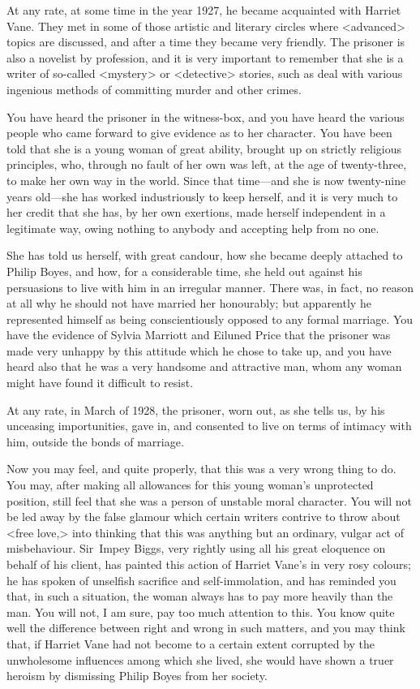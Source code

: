 At any rate, at some time in the year 1927, he became acquainted with Harriet Vane. They met in some of those artistic and literary circles where <advanced> topics are discussed, and after a time they became very friendly. The prisoner is also a novelist by profession, and it is very important to remember that she is a writer of so-called <mystery> or <detective> stories, such as deal with various ingenious methods of committing murder and other crimes.

You have heard the prisoner in the witness-box, and you have heard the various people who came forward to give evidence as to her character. You have been told that she is a young woman of great ability, brought up on strictly religious principles, who, through no fault of her own was left, at the age of twenty-three, to make her own way in the world. Since that time—and she is now twenty-nine years old—she has worked industriously to keep herself, and it is very much to her credit that she has, by her own exertions, made herself independent in a legitimate way, owing nothing to anybody and accepting help from no one.

She has told us herself, with great candour, how she became deeply attached to Philip Boyes, and how, for a considerable time, she held out against his persuasions to live with him in an irregular manner. There was, in fact, no reason at all why he should not have married her honourably; but apparently he represented himself as being conscientiously opposed to any formal marriage. You have the evidence of Sylvia Marriott and Eiluned Price that the prisoner was made very unhappy by this attitude which he chose to take up, and you have heard also that he was a very handsome and attractive man, whom any woman might have found it difficult to resist.

At any rate, in March of 1928, the prisoner, worn out, as she tells us, by his unceasing importunities, gave in, and consented to live on terms of intimacy with him, outside the bonds of marriage.

Now you may feel, and quite properly, that this was a very wrong thing to do. You may, after making all allowances for this young woman's unprotected position, still feel that she was a person of unstable moral character. You will not be led away by the false glamour which certain writers contrive to throw about <free love,> into thinking that this was anything but an ordinary, vulgar act of misbehaviour. Sir~Impey Biggs, very rightly using all his great eloquence on behalf of his client, has painted this action of Harriet Vane's in very rosy colours; he has spoken of unselfish sacrifice and self-immolation, and has reminded you that, in such a situation, the woman always has to pay more heavily than the man. You will not, I am sure, pay too much attention to this. You know quite well the difference between right and wrong in such matters, and you may think that, if Harriet Vane had not become to a certain extent corrupted by the unwholesome influences among which she lived, she would have shown a truer heroism by dismissing Philip Boyes from her society.

